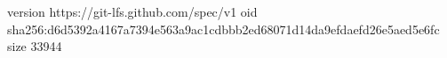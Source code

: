 version https://git-lfs.github.com/spec/v1
oid sha256:d6d5392a4167a7394e563a9ac1cdbbb2ed68071d14da9efdaefd26e5aed5e6fc
size 33944
